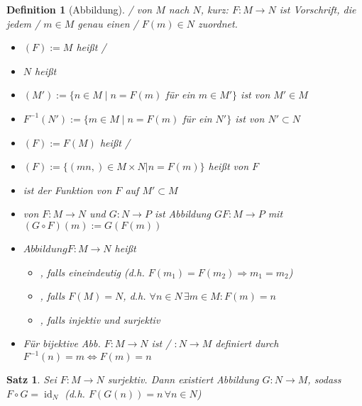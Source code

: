 \documentclass[ngerman,a4paper]{report}
\theoremstyle{break}
\newtheorem{satz}[theorem]{Satz}
\newtheorem*{definition}{Definition}
\newcommand{\highlight}[1]{\emph{#1}}
\DeclareMathOperator{\id}{id}
\DeclareMathOperator{\graph}{graph}
\begin{document}
\begin{definition}[Abbildung]
	/ von $M$ nach $N$, kurz: $F:M\rightarrow N$ ist Vorschrift, die jedem  /  $m\in M$ genau einen  /  $F(m)\in N$ zuordnet.
	
	\begin{itemize}
		\item {}$(F):=M$ heißt  / 
		\item $N$ heißt 
		\item $(M'):=\{n\in M \mid n=F(m)$ für ein $m\in M'\}$ ist \highlight{ von $M'$}$\in M$
		\item $F^{-1}(N'):=\{ m\in M\mid n=F(m)$ für ein $N' \}$ ist \highlight{ von $N'$}$\subset N$
		\item {}$(F):= F(M)$ heißt  / 
		\item \mathsymbol{graph}{$\graph$}$(F) :=\{ (mn,)\in M\times N | n = F(m)\}$ heißt \highlight{von $F$}
		\item {} ist \highlight{der Funktion} von $F$ auf $M'\subset M$
		\item {} von $F:M\rightarrow N$ und $G:N\rightarrow P$ ist Abbildung $G$$F:M\rightarrow P$ mit $(G\circ F)(m):=G(F(m))$
		\item $Abbildung F:M\rightarrow N$ heißt
		\begin{itemize}
			\item {}, falls eineindeutig (d.h. $F(m_1) = F(m_2) \Rightarrow m_1 = m_2$)
			\item {}, falls $F(M) = N$, d.h. $\forall n\in N\,\exists m\in M: F(m) = n$
			\item {}, falls injektiv und surjektiv
		\end{itemize}
		\item Für bijektive Abb. $F:M\rightarrow N$ ist  /  $:N\rightarrow M$ definiert durch $F^{-1}(n) = m \Leftrightarrow F(m) = n$
	\end{itemize}
\end{definition}

\begin{satz}
	Sei $F:M\rightarrow N$ surjektiv. Dann existiert Abbildung $G:N\rightarrow M$, sodass $F\circ G = \id_N$ (d.h. $F(G(n)) = n\,\forall n\in N$)
\end{satz}
\end{document}
